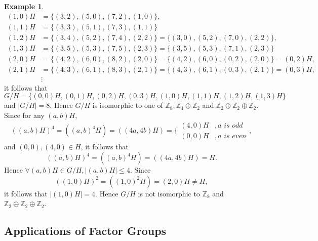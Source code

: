 \documentclass{article}
\newtheorem{theorem}{Theorem}[section]
\theoremstyle{definition}
\newtheorem{example}{Example}[section]
\begin{document}
\begin{example}
\begin{align*}
            (1,0)H &= \{(3,2),(5,0),(7,2),(1,0)\}, \\
            (1,1)H &= \{(3,3),(5,1),(7,3),(1,1)\} \\
            (1,2)H &= \{(3,4),(5,2),(7,4),(2,2)\} = \{(3,0),(5,2),(7,0),(2,2)\}, \\
            (1,3)H &= \{(3,5),(5,3),(7,5),(2,3)\} = \{(3,5),(5,3),(7,1),(2,3)\} \\
            (2,0)H &= \{(4,2),(6,0),(8,2),(2,0)\} = \{(4,2),(6,0),(0,2),(2,0)\} = (0,2)H, \\
            (2,1)H &= \{(4,3),(6,1),(8,3),(2,1)\} = \{(4,3),(6,1),(0,3),(2,1)\} = (0,3)H, \\
            & \vdots
        \end{align*}
        it follows that
        \begin{equation*}
            G/H = \{(0,0)H,(0,1)H,(0,2)H,(0,3)H,(1,0)H,(1,1)H,(1,2)H,(1,3)H\}
        \end{equation*}
        and $|G/H| = 8$. Hence $G/H$ is isomorphic to one of $\mathbb{Z}_8, \mathbb{Z}_4 \oplus \mathbb{Z}_2$ and $\mathbb{Z}_2 \oplus \mathbb{Z}_2 \oplus \mathbb{Z}_2$. Since for any $(a,b)H$,
        \begin{equation*}
            ((a,b)H)^4 = ((a,b)^4H) = ((4a,4b)H) = \bigg\{ \begin{matrix}
               (4,0)H & , a \textit{ is odd} \\
               (0,0)H & , a \textit{ is even}
            \end{matrix},
        \end{equation*}
        and $(0,0),(4,0) \in H$, it follows that 
        \begin{equation*}
            ((a,b)H)^4 = ((a,b)^4H) = ((4a,4b)H) = H.
        \end{equation*}
        Hence $\forall (a,b)H \in G/H, |(a,b)H| \leq 4$. Since
        \begin{equation*}
            ((1,0)H)^2 = ((1,0)^2H) = (2,0)H \neq H,
        \end{equation*}
        it follows that $|(1,0)H|=4$. Hence $G/H$ is not isomorphic to $\mathbb{Z}_8$ and $\mathbb{Z}_2 \oplus \mathbb{Z}_2 \oplus \mathbb{Z}_2$.
     \end{example}
     
     \subsection{Applications of Factor Groups}
     
\end{document}
